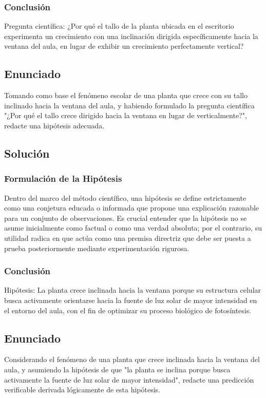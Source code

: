\documentclass[12pt, a4paper]{article}
\begin{document}
\subsubsection*{Conclusión}
Pregunta científica: ¿Por qué el tallo de la planta ubicada en el escritorio experimenta un crecimiento con una inclinación dirigida específicamente hacia la ventana del aula, en lugar de exhibir un crecimiento perfectamente vertical?

\newpage

\subsection*{Enunciado}
Tomando como base el fenómeno escolar de una planta que crece con su tallo inclinado hacia la ventana del aula, y habiendo formulado la pregunta científica "¿Por qué el tallo crece dirigido hacia la ventana en lugar de verticalmente?", redacte una hipótesis adecuada.

\subsection*{Solución}

\subsubsection*{Formulación de la Hipótesis}
Dentro del marco del método científico, una hipótesis se define estrictamente como una conjetura educada o informada que propone una explicación razonable para un conjunto de observaciones. Es crucial entender que la hipótesis no se asume inicialmente como factual o como una verdad absoluta; por el contrario, su utilidad radica en que actúa como una premisa directriz que debe ser puesta a prueba posteriormente mediante experimentación rigurosa.

\subsubsection*{Conclusión}
Hipótesis: La planta crece inclinada hacia la ventana porque su estructura celular busca activamente orientarse hacia la fuente de luz solar de mayor intensidad en el entorno del aula, con el fin de optimizar su proceso biológico de fotosíntesis.

\newpage

\subsection*{Enunciado}
Considerando el fenómeno de una planta que crece inclinada hacia la ventana del aula, y asumiendo la hipótesis de que "la planta se inclina porque busca activamente la fuente de luz solar de mayor intensidad", redacte una predicción verificable derivada lógicamente de esta hipótesis.
\end{document}

